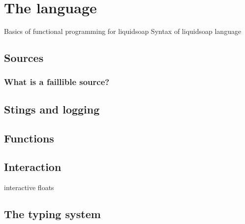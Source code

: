 \chapter{The language}
Basics of functional programming for liquidsoap
Syntax of liquidsoap language

\section{Sources}
\subsection{What is a faillible source?}

\section{Stings and logging}

\section{Functions}

\section{Interaction}
interactive floats

\section{The typing system}
